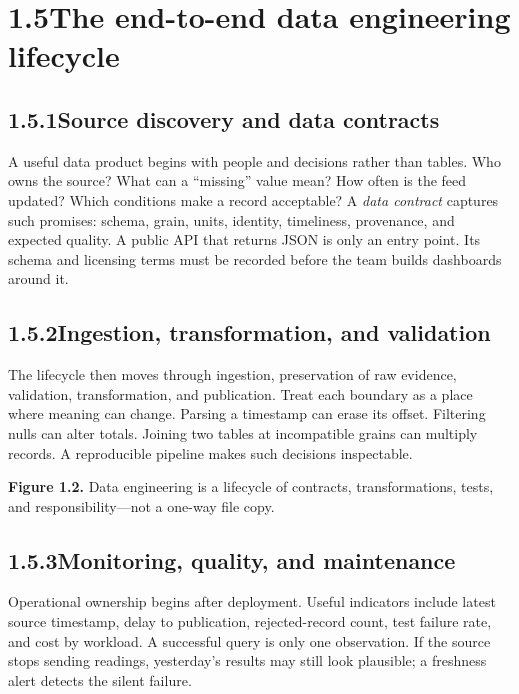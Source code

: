 \documentclass[11pt,twoside]{article}
\newcommand{\topic}[2]{\subsection*{#1\quad #2}}
\begin{document}
\section*{1.5\quad The end-to-end data engineering lifecycle}
\topic{1.5.1}{Source discovery and data contracts}
A useful data product begins with people and decisions rather than tables. Who owns the source? What can a ``missing'' value mean? How often is the feed updated? Which conditions make a record acceptable? A \emph{data contract} captures such promises: schema, grain, units, identity, timeliness, provenance, and expected quality. A public API that returns JSON is only an entry point. Its schema and licensing terms must be recorded before the team builds dashboards around it.

\topic{1.5.2}{Ingestion, transformation, and validation}
The lifecycle then moves through ingestion, preservation of raw evidence, validation, transformation, and publication. Treat each boundary as a place where meaning can change. Parsing a timestamp can erase its offset. Filtering nulls can alter totals. Joining two tables at incompatible grains can multiply records. A reproducible pipeline makes such decisions inspectable.

\begin{center}
\end{center}
{\small\color{inkgray}\textbf{Figure 1.2.} Data engineering is a lifecycle of contracts, transformations, tests, and responsibility---not a one-way file copy.}\par

\topic{1.5.3}{Monitoring, quality, and maintenance}
Operational ownership begins after deployment. Useful indicators include latest source timestamp, delay to publication, rejected-record count, test failure rate, and cost by workload. A successful query is only one observation. If the source stops sending readings, yesterday's results may still look plausible; a freshness alert detects the silent failure.
\end{document}
